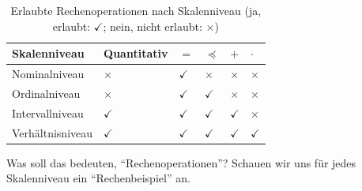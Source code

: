 \documentclass[
  letterpaper,
  twoside,
  open=any]{scrbook}
\theoremstyle{definition}
\theoremstyle{definition}
\theoremstyle{definition}
\theoremstyle{remark}
\begin{document}
\begin{longtable}[]{@{}
  >{\raggedright\arraybackslash}p{}
  >{\raggedright\arraybackslash}p{}
  >{\raggedright\arraybackslash}p{}
  >{\raggedright\arraybackslash}p{}
  >{\raggedright\arraybackslash}p{}
  >{\raggedright\arraybackslash}p{}@{}}

\caption{\label{tbl-skalenniveaus-pdf}Erlaubte Rechenoperationen nach
Skalenniveau (ja, erlaubt: \(\checkmark\); nein, nicht erlaubt:
\(\times\))}

\tabularnewline

\toprule\noalign{}
\begin{minipage}[b]{\linewidth}\raggedright
Skalenniveau
\end{minipage} & \begin{minipage}[b]{\linewidth}\raggedright
Quantitativ
\end{minipage} & \begin{minipage}[b]{\linewidth}\raggedright
\(=\)
\end{minipage} & \begin{minipage}[b]{\linewidth}\raggedright
\(\preceq\)
\end{minipage} & \begin{minipage}[b]{\linewidth}\raggedright
\(+\)
\end{minipage} & \begin{minipage}[b]{\linewidth}\raggedright
\(\cdot\)
\end{minipage} \\
\midrule\noalign{}
\endhead
\bottomrule\noalign{}
\endlastfoot
Nominalniveau & \(\times\) & \(\checkmark\) & \(\times\) & \(\times\) &
\(\times\) \\
Ordinalniveau & \(\times\) & \(\checkmark\) & \(\checkmark\) &
\(\times\) & \(\times\) \\
Intervallniveau & \(\checkmark\) & \(\checkmark\) & \(\checkmark\) &
\(\checkmark\) & \(\times\) \\
Verhältnisniveau & \(\checkmark\) & \(\checkmark\) & \(\checkmark\) &
\(\checkmark\) & \(\checkmark\) \\

\end{longtable}

Was soll das bedeuten, \enquote{Rechenoperationen}? Schauen wir uns für
jedes Skalenniveau ein \enquote{Rechenbeispiel} an.
\end{document}
